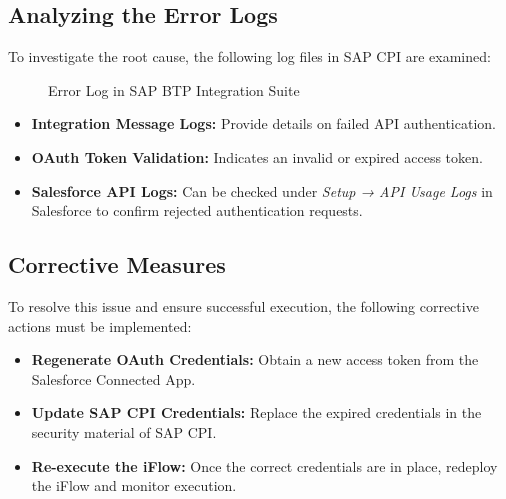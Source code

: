 \subsection{Analyzing the Error Logs}
To investigate the root cause, the following log files in SAP CPI are examined:
    \begin{figure}[H]
    \centering
    \caption{Error Log in SAP BTP Integration Suite}
    
    \end{figure}
\begin{itemize}
    \item \textbf{Integration Message Logs:} Provide details on failed API authentication.
    \item \textbf{OAuth Token Validation:} Indicates an invalid or expired access token.
    \item \textbf{Salesforce API Logs:} Can be checked under \textit{Setup → API Usage Logs} in Salesforce to confirm rejected authentication requests.
\end{itemize}

\subsection{Corrective Measures}
To resolve this issue and ensure successful execution, the following corrective actions must be implemented:

\begin{itemize}
    \item \textbf{Regenerate OAuth Credentials:} Obtain a new access token from the Salesforce Connected App.
    \item \textbf{Update SAP CPI Credentials:} Replace the expired credentials in the security material of SAP CPI.
    \item \textbf{Re-execute the iFlow:} Once the correct credentials are in place, redeploy the iFlow and monitor execution.
\end{itemize}


